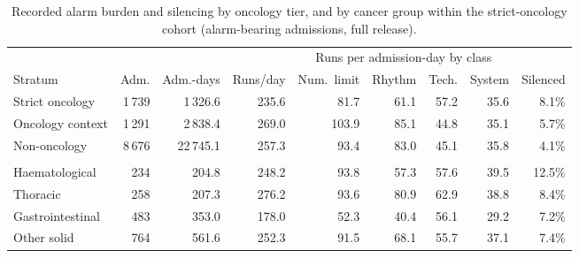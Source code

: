 \documentclass[11pt,letterpaper]{article}
\begin{document}
\begin{table}[htbp]\centering\footnotesize
\setlength{\tabcolsep}{4pt}
\caption{Recorded alarm burden and silencing by oncology tier, and by cancer group within the strict-oncology
cohort (alarm-bearing admissions, full release).}
\label{stab:oncburden}
\setlength{\tabcolsep}{3pt}
\begin{tabular}{lrrrrrrrr}
\toprule
 & & & & \multicolumn{4}{c}{Runs per admission-day by class} & \\
\cmidrule(lr){5-8}
Stratum & Adm. & Adm.-days & Runs/day & Num.\ limit & Rhythm & Tech. & System & Silenced \\
\midrule
Strict oncology & 1\,739 & 1\,326.6 & 235.6 & 81.7 & 61.1 & 57.2 & 35.6 & 8.1\% \\
Oncology context & 1\,291 & 2\,838.4 & 269.0 & 103.9 & 85.1 & 44.8 & 35.1 & 5.7\% \\
Non-oncology & 8\,676 & 22\,745.1 & 257.3 & 93.4 & 83.0 & 45.1 & 35.8 & 4.1\% \\
\addlinespace
\multicolumn{9}{l}{\emph{Strict-oncology cohort by cancer group}} \\
Haematological & 234 & 204.8 & 248.2 & 93.8 & 57.3 & 57.6 & 39.5 & 12.5\% \\
Thoracic & 258 & 207.3 & 276.2 & 93.6 & 80.9 & 62.9 & 38.8 & 8.4\% \\
Gastrointestinal & 483 & 353.0 & 178.0 & 52.3 & 40.4 & 56.1 & 29.2 & 7.2\% \\
Other solid & 764 & 561.6 & 252.3 & 91.5 & 68.1 & 55.7 & 37.1 & 7.4\% \\
\bottomrule
\end{tabular}
\end{table}
\end{document}
